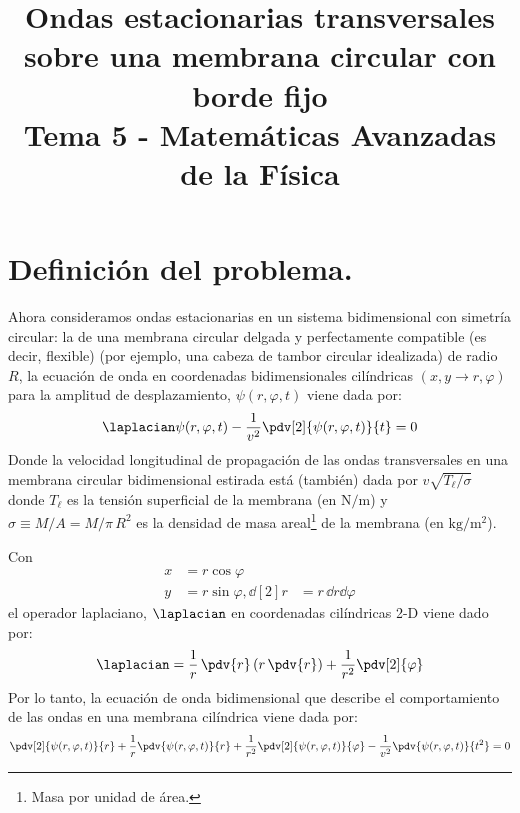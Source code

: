 
\title{Ondas estacionarias transversales sobre una membrana circular con borde fijo \\ {\large Tema 5 - Matemáticas Avanzadas de la Física}\vspace{-1.5\baselineskip}}
\date{ }
\author{}

\maketitle
\fontsize{14}{14}\selectfont
\section{Definición del problema.}
Ahora consideramos ondas estacionarias en un sistema bidimensional con simetría circular: la de una membrana circular delgada y perfectamente compatible (es decir, flexible) (por ejemplo, una cabeza de tambor circular idealizada) de radio $R$, la ecuación de onda en coordenadas bidimensionales cilíndricas $(x , y \rightarrow r, \varphi)$ para la amplitud de desplazamiento, $\psi (r, \varphi, t)$ viene dada por:
\begin{align*}
\laplacian \psi (r, \varphi, t) - \dfrac{1}{v^{2}} \pdv[2]{\psi (r, \varphi, t)}{t} = 0
\end{align*}
Donde la velocidad longitudinal de propagación de las ondas transversales en una membrana circular bidimensional estirada está (también) dada por $v \sqrt{T_{\ell} / \sigma}$ donde $T_{\ell}$ es la tensión superficial de la membrana (en $\si{\newton\per\meter}$) y $\sigma \equiv M / A = M / \pi \, R^{2}$ es la densidad de masa areal\footnote{Masa por unidad de área.} de la membrana (en $\si{\kilo\gram\per\square\meter}$). 
\par
Con 
\begin{align*}
x &= r \cos \varphi \\
y &= r \sin \varphi,
\dd[2]{r} &= r \, \dd{r} \dd{\varphi}
\end{align*}
el operador laplaciano, $\laplacian$ en coordenadas cilíndricas 2-D viene dado por:
\begin{align*}
\laplacian = \dfrac{1}{r} \, \pdv{r} \left( r \, \pdv{r} \right) + \dfrac{1}{r^{2}} \pdv[2]{\varphi}
\end{align*}
Por lo tanto, la ecuación de onda bidimensional que describe el comportamiento de las ondas en una membrana cilíndrica viene dada por:
\begin{align*}
\pdv[2]{\psi (r, \varphi, t)}{r} + \dfrac{1}{r} \pdv{\psi (r, \varphi, t)}{r} + \dfrac{1}{r^{2}} \pdv[2]{\psi (r, \varphi, t)}{\varphi} - \dfrac{1}{v^{2}} \pdv{\psi (r, \varphi, t)}{t^{2}} = 0
\end{align*}
